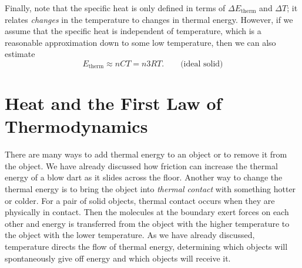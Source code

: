 \begin{table}

\caption{Material properties for a few selected substances.}
\label{table:material_properties}
\end{table}

Finally, note that the specific heat is only defined in terms of
$\Delta E_\text{therm}$ and $\Delta T$; it relates {\it changes} in
the temperature to changes in thermal energy.  However, if we assume
that the specific heat is independent of temperature, which is a
reasonable approximation down to some low temperature, then we can
also estimate
\begin{equation}
E_\text{therm} \approx nCT = n3RT. \qquad\text{(ideal solid)}
\end{equation}


\section{Heat and the First Law of Thermodynamics}
\label{section:heat}

There are many ways to add thermal energy to an object or to remove it
from the object.  We have already discussed how friction can increase
the thermal energy of a blow dart as it slides across the floor.
Another way to change the thermal energy is to bring the object into
{\it thermal contact} with something hotter or colder.  For a pair of
solid objects, thermal contact occurs when they are physically in
contact.  Then the molecules at the boundary exert forces on each
other and energy is transferred from the object with the higher
temperature to the object with the lower temperature.  
As we have already discussed,  temperature directs the flow of
thermal energy, determining which objects will spontaneously give off
energy and which objects will receive it.

